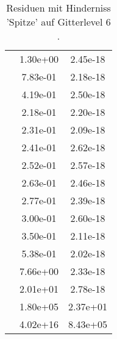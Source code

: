 \begin{table}
\begin{tabular}{c|cc|}
\multicolumn{1}{|c|}{} & \multicolumn{1}{|c|}{  1.30e+00} & \multicolumn{1}{|c|}{  2.45e-18} \\ 
\multicolumn{1}{|c|}{} & \multicolumn{1}{|c|}{  7.83e-01} & \multicolumn{1}{|c|}{  2.18e-18} \\ 
\multicolumn{1}{|c|}{} & \multicolumn{1}{|c|}{  4.19e-01} & \multicolumn{1}{|c|}{  2.50e-18} \\ 
\multicolumn{1}{|c|}{} & \multicolumn{1}{|c|}{  2.18e-01} & \multicolumn{1}{|c|}{  2.20e-18} \\ 
\multicolumn{1}{|c|}{} & \multicolumn{1}{|c|}{  2.31e-01} & \multicolumn{1}{|c|}{  2.09e-18} \\ 
\multicolumn{1}{|c|}{} & \multicolumn{1}{|c|}{  2.41e-01} & \multicolumn{1}{|c|}{  2.62e-18} \\ 
\multicolumn{1}{|c|}{} & \multicolumn{1}{|c|}{  2.52e-01} & \multicolumn{1}{|c|}{  2.57e-18} \\ 
\multicolumn{1}{|c|}{} & \multicolumn{1}{|c|}{  2.63e-01} & \multicolumn{1}{|c|}{  2.46e-18} \\ 
\multicolumn{1}{|c|}{} & \multicolumn{1}{|c|}{  2.77e-01} & \multicolumn{1}{|c|}{  2.39e-18} \\ 
\multicolumn{1}{|c|}{} & \multicolumn{1}{|c|}{  3.00e-01} & \multicolumn{1}{|c|}{  2.60e-18} \\ 
\multicolumn{1}{|c|}{} & \multicolumn{1}{|c|}{  3.50e-01} & \multicolumn{1}{|c|}{  2.11e-18} \\ 
\multicolumn{1}{|c|}{} & \multicolumn{1}{|c|}{  5.38e-01} & \multicolumn{1}{|c|}{  2.02e-18} \\ 
\multicolumn{1}{|c|}{} & \multicolumn{1}{|c|}{  7.66e+00} & \multicolumn{1}{|c|}{  2.33e-18} \\ 
\multicolumn{1}{|c|}{} & \multicolumn{1}{|c|}{  2.01e+01} & \multicolumn{1}{|c|}{  2.78e-18} \\ 
\multicolumn{1}{|c|}{} & \multicolumn{1}{|c|}{  1.80e+05} & \multicolumn{1}{|c|}{  2.37e+01} \\ 
\multicolumn{1}{|c|}{} & \multicolumn{1}{|c|}{  4.02e+16} & \multicolumn{1}{|c|}{  8.43e+05} \\ 
\hline 
\end{tabular}\caption{Residuen mit Hinderniss 'Spitze' auf Gitterlevel 6 .}\label{tab:Residuum_Spitze_level6}
\end{table} 
